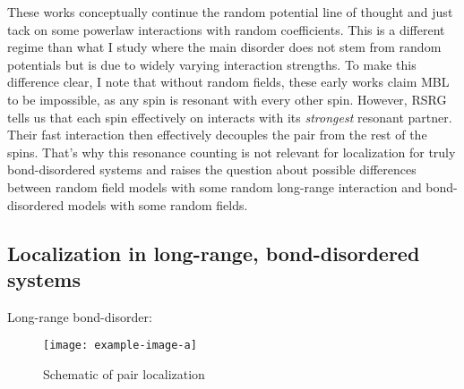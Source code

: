 These works conceptually continue the random potential line of thought and just tack on some powerlaw interactions with random coefficients. This is a different regime than what I study where the main disorder does not stem from random potentials but is due to widely varying interaction strengths. To make this difference clear, I note that without random fields, these early works claim MBL to be impossible, as any spin is resonant with every other spin. However, RSRG tells us that each spin effectively on interacts with its \emph{strongest} resonant partner. Their fast interaction then effectively decouples the pair from the rest of the spins. That's why this resonance counting is not relevant for localization for truly bond-disordered systems and raises the question about possible differences between random field models with some random long-range interaction and bond-disordered models with some random fields.


\subsection{Localization in long-range, bond-disordered systems}

Long-range bond-disorder:
\cite{mohdebEntanglementPropertiesDisordered2020,mohdebExcitedEigenstateEntanglementProperties2022,mohdebGlobalQuenchDynamics2023}

\begin{figure}[htb]
	\centering
	\texttt{[image: example-image-a]}
	\caption{Schematic of pair localization}
\end{figure}

